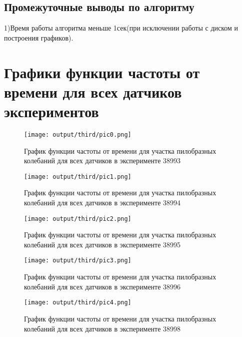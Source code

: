 \documentclass[a4]{article}
\begin{document}
		\subsection{Промежуточные выводы по алгоритму}
			1)Время работы алгоритма меньше 1сек(при исключении работы с диском и построения графиков).
			
	
	\section{Графики функции частоты от времени для всех датчиков экспериментов}
	\begin{center}\newpage
	\begin{figure}[h!]
		\texttt{[image: output/third/pic0.png]}\caption[График функции частоты от времени для участка пилобразных колебаний для всех датчиков в эксперименте 38993]{График функции частоты от времени для участка пилобразных колебаний для всех датчиков в эксперименте 38993}
	\end{figure}\newpage
	\begin{figure}[h!]
		\texttt{[image: output/third/pic1.png]}\caption[График функции частоты от времени для участка пилобразных колебаний для всех датчиков в эксперименте 38994]{График функции частоты от времени для участка пилобразных колебаний для всех датчиков в эксперименте 38994}
	\end{figure}\newpage
	\begin{figure}[h!]
		\texttt{[image: output/third/pic2.png]}\caption[График функции частоты от времени для участка пилобразных колебаний для всех датчиков в эксперименте 38995]{График функции частоты от времени для участка пилобразных колебаний для всех датчиков в эксперименте 38995}
	\end{figure}\newpage
	\begin{figure}[h!]
		\texttt{[image: output/third/pic3.png]}\caption[График функции частоты от времени для участка пилобразных колебаний для всех датчиков в эксперименте 38996]{График функции частоты от времени для участка пилобразных колебаний для всех датчиков в эксперименте 38996}
	\end{figure}\newpage
	\begin{figure}[h!]
		\texttt{[image: output/third/pic4.png]}\caption[График функции частоты от времени для участка пилобразных колебаний для всех датчиков в эксперименте 38998]{График функции частоты от времени для участка пилобразных колебаний для всех датчиков в эксперименте 38998}
	\end{figure}
\end{center}
		\newpage
\end{document}
